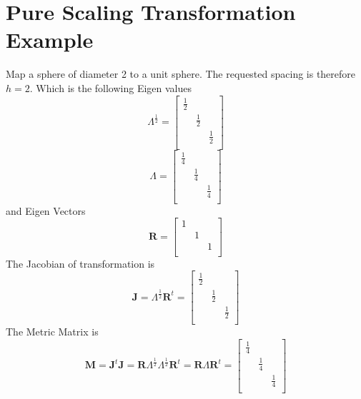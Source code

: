 \documentclass{article}
\begin{document}
\section{Pure Scaling Transformation Example}

Map a sphere of diameter 2 to a unit sphere. 
The requested spacing is therefore $h=2$.
Which is the following Eigen values
\begin{equation}
 \Lambda^\frac{1}{2}=\left[
 \begin{array}{ccc}
   \frac{1}{2}&&\\
   &\frac{1}{2}&\\
   &&\frac{1}{2}\\
 \end{array}\right]
\end{equation}
\begin{equation}
 \Lambda=\left[
 \begin{array}{ccc}
   \frac{1}{4}&&\\
   &\frac{1}{4}&\\
   &&\frac{1}{4}\\
 \end{array}\right]
\end{equation}
and Eigen Vectors
\begin{equation}
 \mathbf{R}=\left[
 \begin{array}{ccc}
   1&&\\
   &1&\\
   &&1\\
 \end{array}\right]
\end{equation}
The Jacobian of transformation is
\begin{equation}
 \mathbf{J}=\Lambda^\frac{1}{2}\mathbf{R}^t=\left[
 \begin{array}{ccc}
   \frac{1}{2}&&\\
   &\frac{1}{2}&\\
   &&\frac{1}{2}\\
 \end{array}\right]
\end{equation}
The Metric Matrix is 
\begin{equation}
 \mathbf{M}=
  \mathbf{J}^t\mathbf{J}=
  \mathbf{R}\Lambda^\frac{1}{2}\Lambda^\frac{1}{2}\mathbf{R}^t=
  \mathbf{R}\Lambda\mathbf{R}^t=
  \left[\begin{array}{ccc}
   \frac{1}{4}&&\\
   &\frac{1}{4}&\\
   &&\frac{1}{4}\\
 \end{array}\right]
\end{equation}
\end{document}
